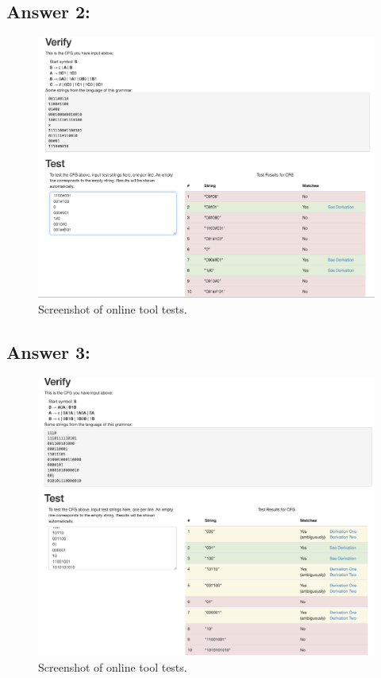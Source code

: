 \documentclass[11pt]{article}
\begin{document}
\subsection*{Answer 2:}
\begin{figure}[htbp!]
    \centering
    \includegraphics[width=0.9\linewidth]{hw8ss2.png}
    \caption{Screenshot of online tool tests.}
    \label{screenshot}
\end{figure}
\subsection*{Answer 3:}
\begin{figure}[htbp!]
    \centering
    \includegraphics[width=0.9\linewidth]{hw8ss3.png}
    \caption{Screenshot of online tool tests.}
    \label{screenshot}
\end{figure}
\end{document}

